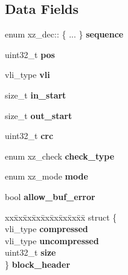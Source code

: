 \subsection*{Data Fields}
\begin{DoxyCompactItemize}
\item 
\mbox{\label{structxz__dec_af850914d0d75dae234ad06c93d376324}} 
enum xz\+\_\+dec\+:: \{ ... \}  {\bfseries sequence}
\item 
\mbox{\label{structxz__dec_ade453888724a695aad5b8b502f237df7}} 
uint32\+\_\+t {\bfseries pos}
\item 
\mbox{\label{structxz__dec_a4b53b57adaf48525101fd6b62f25a7ee}} 
vli\+\_\+type {\bfseries vli}
\item 
\mbox{\label{structxz__dec_ad0b84e46c7aa4d4b19b58a9a8aecbbe6}} 
size\+\_\+t {\bfseries in\+\_\+start}
\item 
\mbox{\label{structxz__dec_a6a48ff0ad93f943766bc8889a487b955}} 
size\+\_\+t {\bfseries out\+\_\+start}
\item 
\mbox{\label{structxz__dec_ad1e224a7b4127f59a2e93861ff85798a}} 
uint32\+\_\+t {\bfseries crc}
\item 
\mbox{\label{structxz__dec_a09812ace29999f1082554fdec6d7962e}} 
enum xz\+\_\+check {\bfseries check\+\_\+type}
\item 
\mbox{\label{structxz__dec_a5684a84ff9e8cab7322f0f8dc33c85b2}} 
enum xz\+\_\+mode {\bfseries mode}
\item 
\mbox{\label{structxz__dec_a9e1aed37f4a4fa12e5153c80e243f0b8}} 
bool {\bfseries allow\+\_\+buf\+\_\+error}
\item 
\mbox{\label{structxz__dec_a6a17b8323dec285bb78e7a44fdca9dd2}} 
\begin{tabbing}
xx\=xx\=xx\=xx\=xx\=xx\=xx\=xx\=xx\=\kill
struct \{\\
\>vli\_type {\bfseries compressed}\\
\>vli\_type {\bfseries uncompressed}\\
\>uint32\_t {\bfseries size}\\
\} {\bfseries block\_header}\\


\end{tabbing}
\end{DoxyCompactItemize}

